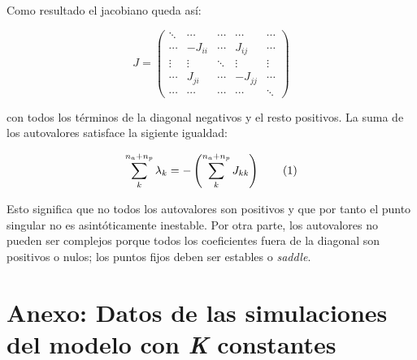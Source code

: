 \noindent Como resultado el jacobiano queda así:

\begin{equation*}
J=\left(
   \begin{array}{ccccc}
      \ddots  & \cdots & \cdots & \cdots & \cdots \\
      \cdots  & -J_{ii} & \cdots & J_{ij} & \cdots \\
      \vdots  & \vdots & \ddots  & \vdots & \vdots  \\
      \cdots  & J_{ji} & \cdots & -J_{jj} & \cdots \\
      \cdots  & \cdots & \cdots & \cdots  & \ddots
   \end{array}
\right)
\end{equation*}

\noindent con todos los términos de la diagonal negativos y el resto positivos. La suma de los autovalores satisface la sigiente igualdad:

\begin{equation}
  \sum_{k}^{n_{a}+n_{p}} \lambda_{k}= -\left(\sum_{k}^{n_{a}+n_{p}} J_{kk}\right)
  \stepcounter{equation}\tag{\theequation}\label{eq:sum_lambdas}
\end{equation}

Esto significa que no todos los autovalores son positivos y que por tanto el punto singular no es asintóticamente inestable. Por otra parte, los autovalores no pueden ser complejos porque todos los coeficientes fuera de la diagonal son positivos o nulos; los puntos fijos deben ser estables o  \textit{saddle}.

\clearpage
\section{Anexo: Datos de las simulaciones del modelo con \textit{K} constantes}
\label{DINAMICA_ANEXO_KConst}


